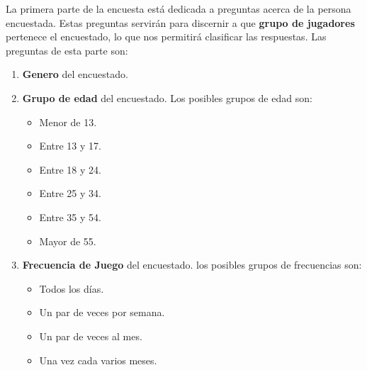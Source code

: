 La primera parte de la encuesta está dedicada a preguntas acerca de la persona encuestada. Estas preguntas servirán para discernir a que \textbf{grupo de jugadores} pertenece el encuestado, lo que nos permitirá clasificar las respuestas. Las preguntas de esta parte son:
\begin{enumerate}
\item \textbf{Genero} del encuestado.
\item \textbf{Grupo de edad} del encuestado. Los posibles grupos de edad son:
\begin{itemize}
\item Menor de 13.
\item Entre 13 y 17.
\item Entre 18 y 24.
\item Entre 25 y 34.
\item Entre 35 y 54.
\item Mayor de 55.
\end{itemize}
\item \textbf{Frecuencia de Juego} del encuestado. los posibles grupos de frecuencias son: 
\begin{itemize}
\item Todos los días.
\item Un par de veces por semana.
\item Un par de veces al mes.
\item Una vez cada varios meses.
\end{itemize}
\end{enumerate}

